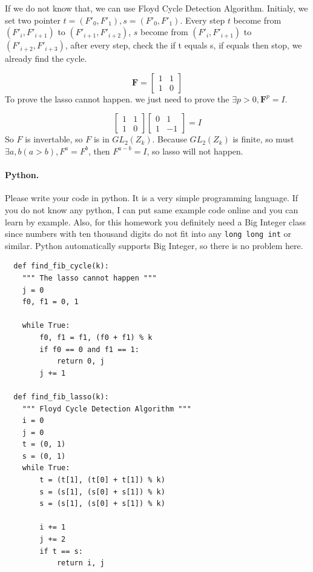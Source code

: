 \documentclass[12pt,a4]{article}
\begin{document}
  If we do not know that, we can use Floyd Cycle Detection Algorithm. Initialy, 
  we set two pointer $t = (F'_0, F'_1), s = (F'_0, F'_1)$. Every step $t$ become from 
  $(F'_i, F'_{i+1})$  to $(F'_{i+1}, F'_{i+2})$, $s$ become from 
  $(F'_i, F'_{i+1})$  to $(F'_{i+2}, F'_{i+3})$, after every step, check the if t equals s,
  if equals then stop, we already find the cycle.

  $$
    {\displaystyle \mathbf {F} ={\begin{bmatrix}1&1\\1&0\end{bmatrix}}}
  $$
  To prove the lasso cannot happen. we just need to prove the 
  $\exists p > 0, \mathbf{F}^p = I$. 

  $$
    \begin{bmatrix}1&1\\1&0\end{bmatrix}
    \begin{bmatrix}0&1\\1&-1\end{bmatrix}=I
  $$
  So $F$ is invertable, so $F$ is in $GL_2(Z_k)$. Because $GL_2(Z_k)$ is finite, so must
  $\exists a, b(a > b), F^a = F^b$, then $F^{a-b}=I$, so lasso will not happen.
  
\paragraph{Python.} Please write your code in python. It is a very simple programming
language. If you do not know any python, I can put same example code online and 
you can learn by example. Also, for this homework you definitely need a Big Integer class
since numbers with ten thousand digits do not fit into any \texttt{long long int} or similar.
Python automatically supports Big Integer, so there is no problem here.
\begin{verbatim}
  def find_fib_cycle(k):
    """ The lasso cannot happen """
    j = 0
    f0, f1 = 0, 1
    
    while True:
        f0, f1 = f1, (f0 + f1) % k
        if f0 == 0 and f1 == 1:
            return 0, j
        j += 1

  def find_fib_lasso(k):
    """ Floyd Cycle Detection Algorithm """
    i = 0
    j = 0
    t = (0, 1)
    s = (0, 1)
    while True:
        t = (t[1], (t[0] + t[1]) % k)
        s = (s[1], (s[0] + s[1]) % k)
        s = (s[1], (s[0] + s[1]) % k)

        i += 1
        j += 2
        if t == s:
            return i, j
\end{verbatim}
\end{document}
